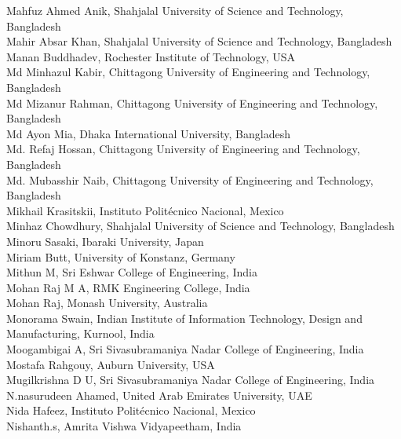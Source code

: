 \documentclass[11pt,oneside]{book}
\begin{document}
\begin{description}
              Mahfuz Ahmed Anik, Shahjalal University of Science and Technology, Bangladesh\\
              Mahir Absar Khan, Shahjalal University of Science and Technology, Bangladesh\\
              Manan Buddhadev, Rochester Institute of Technology, USA\\
              Md Minhazul Kabir, Chittagong University of Engineering and Technology, Bangladesh\\
              Md Mizanur Rahman, Chittagong University of Engineering and Technology, Bangladesh\\
              Md Ayon Mia, Dhaka International University, Bangladesh\\
              Md. Refaj Hossan, Chittagong University of Engineering and Technology, Bangladesh\\
              Md. Mubasshir Naib, Chittagong University of Engineering and Technology, Bangladesh\\
              Mikhail Krasitskii, Instituto Politécnico Nacional, Mexico\\
              Minhaz Chowdhury, Shahjalal University of Science and Technology, Bangladesh\\
              Minoru Sasaki, Ibaraki University, Japan\\
              Miriam Butt, University of Konstanz, Germany\\
              Mithun M, Sri Eshwar College of Engineering, India\\
              Mohan Raj M A, RMK Engineering College, India\\
              Mohan Raj, Monash University, Australia\\
              Monorama Swain, Indian Institute of Information Technology, Design and Manufacturing, Kurnool, India\\
              Moogambigai A, Sri Sivasubramaniya Nadar College of Engineering, India\\
              Mostafa Rahgouy, Auburn University, USA\\
              Mugilkrishna D U, Sri Sivasubramaniya Nadar College of Engineering, India\\
              N.nasurudeen Ahamed, United Arab Emirates University, UAE\\
              Nida Hafeez, Instituto Politécnico Nacional, Mexico\\
              Nishanth.s, Amrita Vishwa Vidyapeetham, India\\

\end{description}
\end{document}
